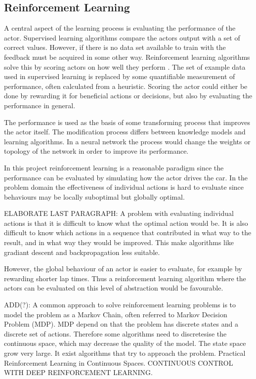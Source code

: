 \subsection{Reinforcement Learning}
A central aspect of the learning process is evaluating the performance of the actor. Supervised learning algorithms compare the actors output with a set of correct values. However, if there is no data set available to train with the feedback must be acquired in some other way. Reinforcement learning algorithms solve this by scoring actors on how well they perform \cite{whiteson}. The set of example data used in supervised learning is replaced by some quantifiable measurement of performance, often calculated from a heuristic. Scoring the actor could either be done by rewarding it for beneficial actions or decisions, but also by evaluating the performance in general. 

The performance is used as the basis of some transforming process that improves the actor itself. The modification process differs between knowledge models and learning algorithms. In a neural network the process would change the weights or topology of the network in order to improve its performance.

In this project reinforcement learning is a reasonable paradigm since the performance can be evaluated by simulating how the actor drives the car. In the problem domain the effectiveness of individual actions is hard to evaluate since behaviours may be locally suboptimal but globally optimal. 

ELABORATE LAST PARAGRAPH: A problem with evaluating individual actions is that it is difficult to know what the optimal action would be. It is also difficult to know which actions in a sequence that contributed in what way to the result, and in what way they would be improved. This make algorithms like gradiant descent and backpropagation less suitable.

However, the global behaviour of an actor is easier to evaluate, for example by rewarding shorter lap times. Thus a reinforcement learning algorithm where the actors can be evaluated on this level of abstraction would be favourable. 

ADD(?): A common approach to solve reinforcement learning problems is to model the problem as a Markov Chain, often referred to Markov Decision Problem (MDP). MDP depend on that the problem has discrete states and a discrete set of actions. Therefore some algorithms need to discretesise the continuous space, which may decrease the quality of the model. The state space grow very large. 
It exist algorithms that try to approach the problem. Practical Reinforcement Learning in Continuous Spaces. CONTINUOUS CONTROL WITH DEEP REINFORCEMENT LEARNING. 


